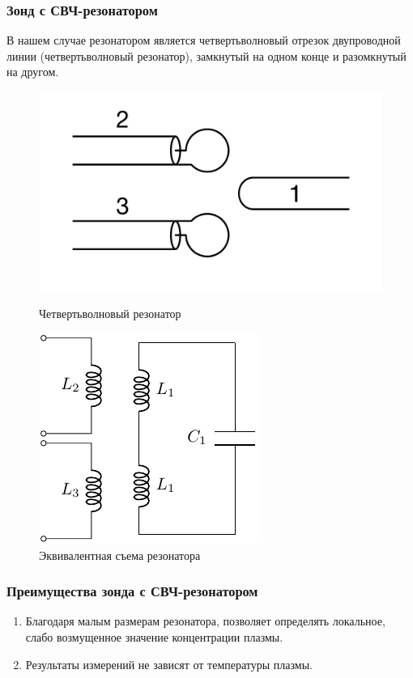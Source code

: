 \documentclass[10pt,pdf,hyperref={unicode}, dvipsnames]{beamer}
\begin{document}
\begin{frame}
	\frametitle{Зонд с СВЧ-резонатором}
	В нашем случае резонатором является четвертьволновый отрезок двупроводной линии (четвертьволновый резонатор), замкнутый на одном конце и разомкнутый на другом. 
	\begin{figure}[H]
	\begin{minipage}{0.49\linewidth}
			\centering
			\includegraphics[width=\linewidth]{fig/resonator}
			\caption{Четвертьволновый резонатор}
			\label{fig:resonator}
	\end{minipage}
	\begin{minipage}{0.49\linewidth}		
			\centering
			\includegraphics[]{chem/chem1}
			\caption{Эквивалентная съема резонатора}
			\label{fig:chem1}
	\end{minipage}
	\end{figure}
\end{frame}

\begin{frame}
	\frametitle{Преимущества зонда с СВЧ-резонатором}
	\begin{enumerate}
		\item Благодаря малым размерам резонатора, позволяет определять локальное, слабо возмущенное значение концентрации плазмы.
		\item Результаты измерений не зависят от температуры плазмы.
	\end{enumerate}
\end{frame}
\end{document}
